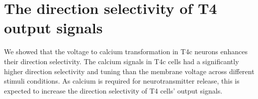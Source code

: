 \section{The direction selectivity of T4 output signals}
We showed that the voltage to calcium transformation in T4c neurons enhances their direction selectivity. The calcium signals in T4c cells had a significantly higher direction selectivity and tuning than the membrane voltage across different stimuli conditions. As calcium is required for neurotransmitter release, this is expected to increase the direction selectivity of T4 cells' output signals. 

